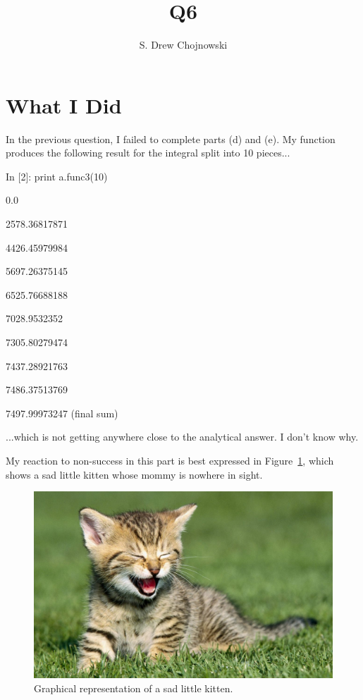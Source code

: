 \documentclass[preprint2]{aastex}
\begin{document}
\title{Q6}


\author{S. Drew Chojnowski}

\vspace{0.5cm}

\section{What I Did}

In the previous question, I failed to complete parts (d) and (e). My function produces the following result for the integral split into 10 pieces...

In [2]: print a.func3(10)

0.0

2578.36817871

4426.45979984

5697.26375145

6525.76688188

7028.9532352

7305.80279474

7437.28921763

7486.37513769

7497.99973247 (final sum)

...which is not getting anywhere close to the analytical answer. I don't know why.

My reaction to non-success in this part is best expressed in Figure~\ref{kittenfig}, which shows a sad little kitten whose mommy is nowhere in sight.


\begin{figure}[h!]
\includegraphics[angle=0,scale=.18]{kitten.jpg}
\caption{Graphical representation of a sad little kitten. \label{kittenfig}}
\end{figure}
\end{document}
